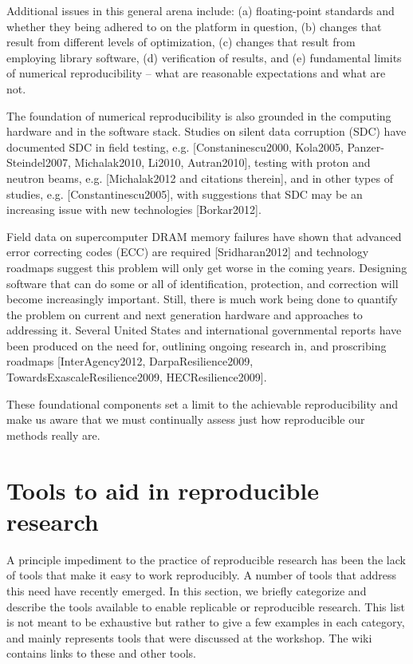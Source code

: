 \documentclass[11pt]{article}
\begin{document}
Additional issues in this general arena include: (a) floating-point
standards and whether they being adhered to on the platform in question, (b)
changes that result from different levels of optimization, (c) changes that
result from employing library software, (d) verification of results, and (e)
fundamental limits of numerical reproducibility – what are reasonable
expectations and what are not.

The foundation of numerical reproducibility is also grounded in the
computing hardware and in the software stack. Studies on silent data
corruption (SDC)  have documented SDC in field testing, e.g.
[Constaninescu2000, Kola2005, Panzer-Steindel2007, Michalak2010, Li2010,
Autran2010], testing with proton and neutron beams, e.g. [Michalak2012 and
citations therein], and in other types of studies, e.g.
[Constantinescu2005], with suggestions that SDC may be an increasing issue
with new technologies [Borkar2012].  

Field data on supercomputer DRAM memory failures have shown that advanced
error correcting codes (ECC) are required [Sridharan2012] and technology
roadmaps suggest this problem will only get worse in the coming years.
Designing software that can do some or all of identification, protection,
and correction will become increasingly important.  Still, there is much
work being done to quantify the problem on current and next generation
hardware and approaches to addressing it.  Several United States and
international governmental reports have been produced on the need for,
outlining ongoing research in, and proscribing roadmaps [InterAgency2012,
DarpaResilience2009, TowardsExascaleResilience2009, HECResilience2009].

These foundational components set a limit to the achievable reproducibility
and make us aware that we must continually assess just how reproducible our
methods really are.

\section{Tools to aid in reproducible research} \label{sec:tools}

A principle impediment to the practice of reproducible research has been the
lack of tools that make it easy to work reproducibly.  A number of tools
that address this need have recently emerged.  In this section, we briefly
categorize and describe the tools available to enable replicable or
reproducible research.  This list is not meant to be exhaustive but rather
to give a few examples in each category, and mainly
represents tools that were discussed at the workshop. 
The wiki contains links to these and other tools.
\end{document}
